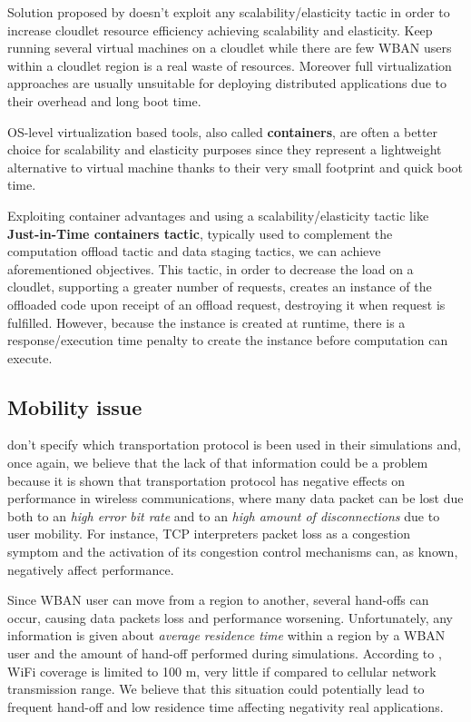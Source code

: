\documentclass[sigchi]{acmart}
\begin{document}
Solution proposed by \citep{MSAReport} doesn't exploit any scalability/elasticity tactic in order to increase cloudlet resource efficiency achieving scalability and elasticity. Keep running several virtual machines on a cloudlet while there are few WBAN users within a cloudlet region is a real waste of resources. Moreover full virtualization approaches are usually unsuitable for deploying distributed applications due to their overhead and long boot time.

OS-level virtualization based tools, also called \textbf{containers}, are often a better choice for scalability and elasticity purposes since they represent a lightweight alternative to virtual machine thanks to their very small footprint and quick boot time. 

Exploiting container advantages and using a scalability/elasticity tactic like \textbf{Just-in-Time containers tactic}, typically used to complement the computation offload tactic and data staging tactics, we can achieve aforementioned objectives. This tactic, in order to decrease the load on a cloudlet, supporting a greater number of requests, creates an instance of the offloaded code upon receipt of an offload request, destroying it when request is fulfilled. However, because the instance is created at runtime, there is a response/execution time penalty to create the instance before computation can execute.

\subsection{Mobility issue}

\citet{MSAReport} don't specify which transportation protocol is been used in their simulations and, once again, we believe that the lack of that information could be a problem because it is shown that transportation protocol has negative effects on performance in wireless communications, where many data packet can be lost due both to an \textit{high error bit rate} and to an \textit{high amount of disconnections} due to user mobility. For instance, TCP interpreters packet loss as a congestion symptom and the activation of its congestion control mechanisms can, as known, negatively affect performance. 

Since WBAN user can move from a region to another, several hand-offs can occur, causing data packets loss and performance worsening. Unfortunately, any information is given about \textit{average residence time} within a region by a WBAN user and the amount of hand-off performed during simulations. According to \citet{MSAReport}, WiFi coverage is limited to 100 m, very little if compared to cellular network transmission range. We believe that this situation could potentially lead to frequent hand-off and low residence time affecting negativity real applications.
\end{document}
